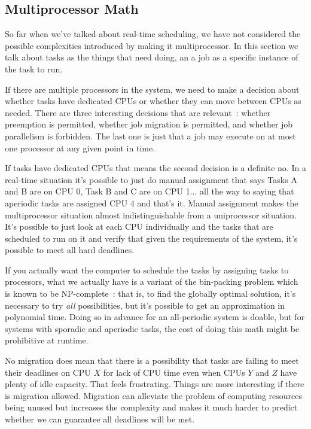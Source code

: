 \subsection*{Multiprocessor Math}

So far when we've talked about real-time scheduling, we have not considered the possible complexities introduced by making it multiprocessor. In this section we talk about tasks as the things that need doing, an a job as a specific instance of the task to run.

If there are multiple processors in the system, we need to make a decision about whether tasks have dedicated CPUs or whether they can move between CPUs as needed. There are three interesting decisions that are relevant~\cite{sa-rt}: whether preemption is permitted, whether job migration is permitted, and whether job parallelism is forbidden. The last one is just that a job may execute on at most one processor at any given point in time.

If tasks have dedicated CPUs that means the second decision is a definite no.  In a real-time situation it's possible to just do manual assignment that says Tasks A and B are on CPU 0, Task B and C are on CPU 1... all the way to saying that aperiodic tasks are assigned CPU 4 and that's it. Manual assignment makes the multiprocessor situation almost indistinguishable from a uniprocessor situation. It's possible to just look at each CPU individually and the tasks that are scheduled to run on it and verify that given the requirements of the system, it's possible to meet all hard deadlines.

If you actually want the computer to schedule the tasks by assigning tasks to processors, what we actually have is a variant of the bin-packing problem which is known to be NP-complete~\cite{sa-rt}: that is, to find the globally optimal solution, it's necessary to try \textit{all} possibilities, but it's possible to get an approximation in polynomial time. Doing so in advance for an all-periodic system is doable, but for systems with sporadic and aperiodic tasks, the cost of doing this math might be prohibitive at runtime. 

No migration does mean that there is a possibility that tasks are failing to meet their deadlines on CPU $X$ for lack of CPU time even when CPUs $Y$ and $Z$ have plenty of idle capacity. That feels frustrating. Things are more interesting if there is migration allowed. Migration can alleviate the problem of computing resources being unused but increases the complexity and makes it much harder to predict whether we can guarantee all deadlines will be met. 

